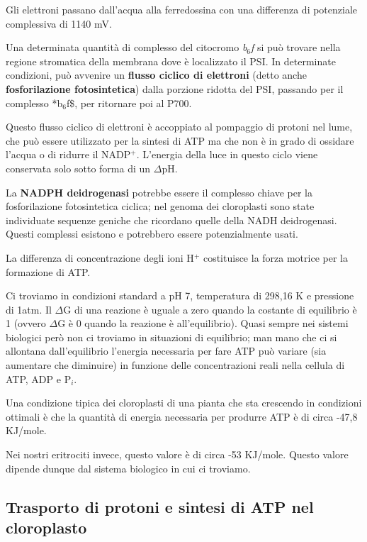 \documentclass[]{article}
\begin{document}
Gli elettroni passano dall'acqua alla ferredossina con una differenza di
potenziale complessiva di 1140 mV.

Una determinata quantità di complesso del citocromo \emph{b$_6$f} si può
trovare nella regione stromatica della membrana dove è localizzato il
PSI. In determinate condizioni, può avvenire un \textbf{flusso ciclico
di elettroni} (detto anche \textbf{fosforilazione fotosintetica}) dalla
porzione ridotta del PSI, passando per il complesso *b$_6$f\$, per
ritornare poi al P700.

Questo flusso ciclico di elettroni è accoppiato al pompaggio di protoni
nel lume, che può essere utilizzato per la sintesi di ATP ma che non è
in grado di ossidare l'acqua o di ridurre il NADP$^+$. L'energia della
luce in questo ciclo viene conservata solo sotto forma di un $\Delta$pH.

La \textbf{NADPH deidrogenasi} potrebbe essere il complesso chiave per
la fosforilazione fotosintetica ciclica; nel genoma dei cloroplasti sono
state individuate sequenze geniche che ricordano quelle della NADH
deidrogenasi. Questi complessi esistono e potrebbero essere
potenzialmente usati.

La differenza di concentrazione degli ioni H$^+$ costituisce la forza
motrice per la formazione di ATP.

Ci troviamo in condizioni standard a pH 7, temperatura di 298,16 K e
pressione di 1atm. Il $\Delta$G di una reazione è uguale a zero quando
la costante di equilibrio è 1 (ovvero $\Delta$G è 0 quando la reazione è
all'equilibrio). Quasi sempre nei sistemi biologici però non ci troviamo
in situazioni di equilibrio; man mano che ci si allontana
dall'equilibrio l'energia necessaria per fare ATP può variare (sia
aumentare che diminuire) in funzione delle concentrazioni reali nella
cellula di ATP, ADP e P$_i$.

Una condizione tipica dei cloroplasti di una pianta che sta crescendo in
condizioni ottimali è che la quantità di energia necessaria per produrre
ATP è di circa -47,8 KJ/mole.

Nei nostri eritrociti invece, questo valore è di circa -53 KJ/mole.
Questo valore dipende dunque dal sistema biologico in cui ci troviamo.

\subsection{Trasporto di protoni e sintesi di ATP nel
cloroplasto}\label{trasporto-di-protoni-e-sintesi-di-atp-nel-cloroplasto}
\end{document}
